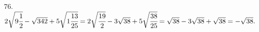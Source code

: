 76. $2\sqrt{9\cfrac{1}{2}}-\sqrt{342}+5\sqrt{1\cfrac{13}{25}}=2\sqrt{\cfrac{19}{2}}-3\sqrt{38}+5\sqrt{\cfrac{38}{25}}=\sqrt{38}-3\sqrt{38}+\sqrt{38}=-\sqrt{38}.$\\
